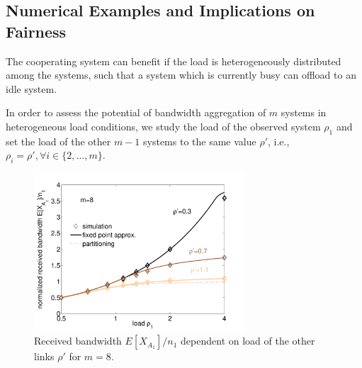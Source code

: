 \subsection{Numerical Examples and Implications on Fairness}\label{sec:aggregation:imbalanced:numerical_examples}

The cooperating system can benefit if the load is heterogeneously distributed among the systems, such that a system which is currently busy can offload to an idle system.

In order to assess the potential of bandwidth aggregation of $m$ systems in heterogeneous load conditions, we study the load of the observed system $\rho_1$ and set the load of the other $m-1$ systems to the same value $\rho'$, i.e., $\rho_i=\rho',\forall i\in\{2,\dotsc,m\}$.

\begin{figure}[tb]
	\centering
	\includegraphics[width=0.7\textwidth]{aggregation/performance_model/figures/fp_bw_m8}
 	\caption{Received bandwidth $E[X_{A_1}]/n_1$ dependent on load of the other links $\rho'$ for $m=8$.}
 	\label{fig:bw_m8}
\end{figure}

